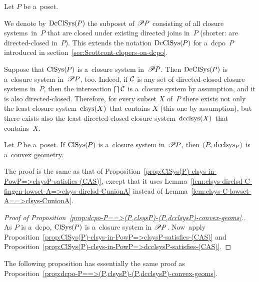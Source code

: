 \documentclass[11pt,letterpaper]{article}
\renewcommand{\thmskip}{\bigskip}
\begin{document}
\thmskip

Let $P$ be a~poset.

We denote by $\mathop{\smash{\mathrm{DcClSys}}}\nolimits(\mspace{-1mu} P)$ the subposet of $\mathscr{P}\mspace{-1mu} P$
consisting of all closure systems~in~$P$ that are closed under existing directed joins in~$P$
		(shorter: are directed-closed in~$P$).
This extends the notation $\mathop{\smash{\mathrm{DcClSys}}}\nolimits(\mspace{-1mu} P)$ for a~dcpo~$P$
	introduced in section~\ref{sec:Scottcont-clopers-on-dcpo}.

Suppose that $\mathop{\smash{\mathrm{ClSys}}}\nolimits(\mspace{-1mu} P)$ is a~closure system in~$\mathscr{P}\mspace{-1mu} P$.
Then $\mathop{\smash{\mathrm{DcClSys}}}\nolimits(\mspace{-1mu} P)$ is a~closure system in~$\mathscr{P}\mspace{-1mu} P$, too.
Indeed, if $\mathcal{C}$ is any set of directed-closed closure systems in~$P$,
then the intersection $\mathop{\textstyle\bigcap}\nolimits\mathcal{C}$ is a~closure system by assumption,
and it is also directed-closed.
Therefore, for every subset $X$ of~$P$
there exists not only
    the least closure system $\mspace{2mu}\mathop{\smash{\mathrm{clsys}}}\nolimits(X)\mspace{2mu}$ that contains $X$
	(this one by assumption),
but there exists also
    the least directed-closed closure system $\mspace{2mu}\mathop{\smash{\mathrm{dcclsys}}}\nolimits(X)\mspace{2mu}$ that contains~$X$.

\thmskip

\begin{proposition}\label{prop:ClSys(P)-clsys-in-PowP=>dcclsysP-satisfies-(CAS)}
Let\/ $P$ be a~poset.
If\/ $\mathop{\smash{\mathrm{ClSys}}}\nolimits(\mspace{-1mu} P)$ is a~closure system in\/~$\mathscr{P}\mspace{-1mu} P$,
then $\langle\mspace{1mu} P,\mspace{2mu}\mathop{\smash{\mathrm{dcclsys}}}\nolimits_P \mspace{1mu}\rangle$ is a~convex geometry.
\end{proposition}

\thmskip

The proof is the same
	as that of Proposition~\ref{prop:ClSys(P)-clsys-in-PowP=>clsysP-satisfies-(CAS)},
except that it uses Lemma~\ref{lem:clsys-dirclsd-C-fingen-lowset-A=>clsys-dirclsd-CunionA}
	instead of Lemma~\ref{lem:clsys-C-lowset-A==>clsys-CunionA}.

\thmskip

\begin{proof}[Proof of Proposition~\ref{prop:dcpo-P==>(P,clsysP)-(P,dcclsysP)-convex-geoms}.]
As $P$ is a~dcpo, $\mathop{\smash{\mathrm{ClSys}}}\nolimits(\mspace{-1mu} P)$ is a~closure system in $\mathscr{P}\mspace{-1mu} P$.
Now~apply Proposition~\ref{prop:ClSys(P)-clsys-in-PowP=>clsysP-satisfies-(CAS)}
	and Proposition~\ref{prop:ClSys(P)-clsys-in-PowP=>dcclsysP-satisfies-(CAS)}.
\end{proof}

\thmskip

The following proposition has essentially the same proof
	as Proposition~\ref{prop:dcpo-P==>(P,clsysP)-(P,dcclsysP)-convex-geoms}.
\end{document}
